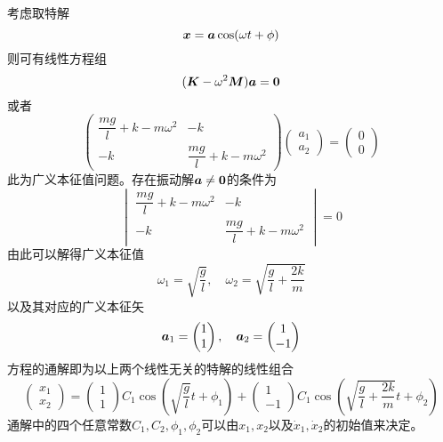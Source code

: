 \begin{example}[弹性耦合摆]
\begin{equation*}
\end{equation*}
考虑取特解
\begin{equation*}
	\boldsymbol{x} = \boldsymbol{a} \cos (\omega t+\phi)
\end{equation*}
则可有线性方程组
\begin{equation*}
	(\boldsymbol{K} - \omega^2 \boldsymbol{M}) \boldsymbol{a} = \boldsymbol{0}
\end{equation*}
或者
\begin{equation*}
	\begin{pmatrix} \dfrac{mg}{l}+k-m\omega^2 & -k \\[1.5ex] -k & \dfrac{mg}{l}+k-m\omega^2 \end{pmatrix} \begin{pmatrix} a_1 \\ a_2 \end{pmatrix} = \begin{pmatrix} 0 \\ 0 \end{pmatrix}
\end{equation*}
此为{\heiti 广义本征值问题}。存在振动解$\boldsymbol{a} \neq \boldsymbol{0}$的条件为
\begin{equation*}
	\begin{vmatrix} \dfrac{mg}{l} + k - m\omega^2 & -k \\[1.5ex] -k & \dfrac{mg}{l} + k - m\omega^2 \end{vmatrix} = 0
\end{equation*}
由此可以解得广义本征值
\begin{equation*}
	\omega_1 = \sqrt{\dfrac{g}{l}},\quad \omega_2 = \sqrt{\frac{g}{l} + \frac{2k}{m}}
\end{equation*}
以及其对应的广义本征矢
\begin{equation*}
	\boldsymbol{a}_1 = \begin{pmatrix} 1 \\ 1 \end{pmatrix},\quad \boldsymbol{a}_2 = \begin{pmatrix} 1 \\ -1 \end{pmatrix}
\end{equation*}
方程的通解即为以上两个线性无关的特解的线性组合
\begin{equation*}
	\begin{pmatrix} x_1 \\ x_2 \end{pmatrix} = \begin{pmatrix} 1 \\ 1 \end{pmatrix} C_1 \cos \left(\sqrt{\frac{g}{l}}t + \phi_1 \right) + \begin{pmatrix} 1 \\ -1 \end{pmatrix} C_1 \cos \left(\sqrt{\frac{g}{l} + \frac{2k}{m}}t + \phi_2 \right)
\end{equation*}
通解中的四个任意常数$C_1,C_2,\phi_1,\phi_2$可以由$x_1,x_2$以及$\dot{x}_1,\dot{x}_2$的初始值来决定。
\end{example}

